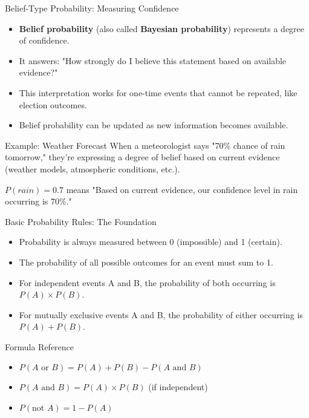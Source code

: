 \documentclass{beamer}
\begin{document}
	\begin{frame}{Belief-Type Probability: Measuring Confidence}
		\begin{itemize}
			\item \textbf{Belief probability} (also called \textbf{Bayesian probability}) represents a degree of confidence.
			\item It answers: "How strongly do I believe this statement based on available evidence?"
			\item This interpretation works for one-time events that cannot be repeated, like election outcomes.
			\item Belief probability can be updated as new information becomes available.
		\end{itemize}
		
		\begin{exampleblock}{Example: Weather Forecast}
			When a meteorologist says "70\% chance of rain tomorrow," they're expressing a degree of belief based on current evidence (weather models, atmospheric conditions, etc.).
			
			$P(rain) = 0.7$ means "Based on current evidence, our confidence level in rain occurring is 70\%."
		\end{exampleblock}
	\end{frame}
	
	\begin{frame}{Basic Probability Rules: The Foundation}
		\begin{itemize}
			\item Probability is always measured between 0 (impossible) and 1 (certain).
			\item The probability of all possible outcomes for an event must sum to 1.
			\item For independent events A and B, the probability of both occurring is $P(A) \times P(B)$.
			\item For mutually exclusive events A and B, the probability of either occurring is $P(A) + P(B)$.
		\end{itemize}
		
		\begin{block}{Formula Reference}
			\begin{itemize}
				\item $P(A \text{ or } B) = P(A) + P(B) - P(A \text{ and } B)$
				\item $P(A \text{ and } B) = P(A) \times P(B)$ (if independent)
				\item $P(\text{not } A) = 1 - P(A)$
			\end{itemize}
		\end{block}
	\end{frame}
	
\end{document}
